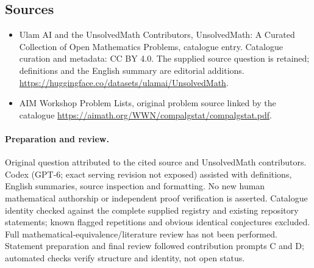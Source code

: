 \documentclass[11pt]{article}
\begin{document}
\subsection{Sources}
\begin{itemize}
\item[\hypertarget{source:statement:1}{S1}] Ulam AI and the UnsolvedMath Contributors, UnsolvedMath: A Curated Collection of Open Mathematics Problems, catalogue entry. Catalogue curation and metadata: CC BY 4.0. The supplied source question is retained; definitions and the English summary are editorial additions.
\url{https://huggingface.co/datasets/ulamai/UnsolvedMath}.
\item[\hypertarget{source:statement:2}{S2}] AIM Workshop Problem Lists, original problem source linked by the catalogue
\url{https://aimath.org/WWN/compalgstat/compalgstat.pdf}.
\end{itemize}
\paragraph{Preparation and review.}
Original question attributed to the cited source and UnsolvedMath contributors. Codex (GPT-6; exact serving revision not exposed) assisted with definitions, English summaries, source inspection and formatting. No new human mathematical authorship or independent proof verification is asserted. Catalogue identity checked against the complete supplied registry and existing repository statements; known flagged repetitions and obvious identical conjectures excluded. Full mathematical-equivalence/literature review has not been performed. Statement preparation and final review followed contribution prompts C and D; automated checks verify structure and identity, not open status.
\label{end:statement}
\end{document}
